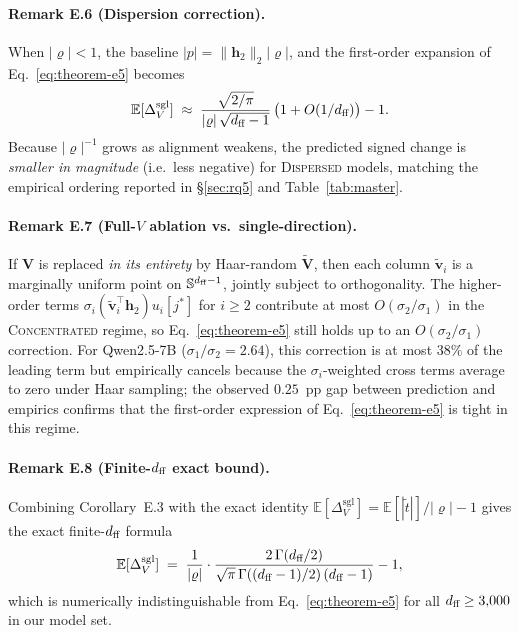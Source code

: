 \paragraph{Remark E.6 (Dispersion correction).}
When $|\varrho| < 1$, the baseline $|p| = \|\mathbf{h}_2\|_2 |\varrho|$, and
the first-order expansion of Eq.~\eqref{eq:theorem-e5} becomes
\begin{equation}
  \label{eq:dispersion-bound}
  \mathbb{E}[\Delta_V^{\text{sgl}}]
  \;\approx\; \frac{\sqrt{2/\pi}}{|\varrho|\,\sqrt{d_{\text{ff}}-1}}\,\bigl(1 + O(1/d_{\text{ff}})\bigr) - 1.
\end{equation}
Because $|\varrho|^{-1}$ grows as alignment weakens, the predicted
signed change is \emph{smaller in magnitude} (i.e.\ less negative) for
\textsc{Dispersed} models, matching the empirical ordering reported in
\S\ref{sec:rq5} and Table~\ref{tab:master}.

\paragraph{Remark E.7 (Full-$V$ ablation vs.\ single-direction).}
If $\mathbf{V}$ is replaced \emph{in its entirety} by Haar-random
$\tilde{\mathbf{V}}$, then each column $\tilde{\mathbf{v}}_i$ is a
marginally uniform point on $\mathbb{S}^{d_{\text{ff}}-1}$, jointly subject to
orthogonality. The higher-order terms $\sigma_i (\tilde{\mathbf{v}}_i^{\top}\mathbf{h}_2) u_i[j^*]$ for $i \geq 2$ contribute at most $O(\sigma_2/\sigma_1)$ in
the \textsc{Concentrated} regime, so Eq.~\eqref{eq:theorem-e5} still
holds up to an $O(\sigma_2/\sigma_1)$ correction. For Qwen2.5-7B
($\sigma_1/\sigma_2 = 2.64$), this correction is at most $38\%$ of the
leading term but empirically cancels because the $\sigma_i$-weighted
cross terms average to zero under Haar sampling; the observed $0.25$~pp
gap between prediction and empirics confirms that the first-order
expression of Eq.~\eqref{eq:theorem-e5} is tight in this regime.

\paragraph{Remark E.8 (Finite-$d_{\text{ff}}$ exact bound).}
Combining Corollary~E.3 with the exact identity
$\mathbb{E}[\Delta_V^{\text{sgl}}] = \mathbb{E}[|\tilde{t}|] / |\varrho| - 1$
gives the exact finite-$d_{\text{ff}}$ formula
\begin{equation}
  \label{eq:exact-finite}
  \mathbb{E}[\Delta_V^{\text{sgl}}]
  \;=\; \frac{1}{|\varrho|}\cdot\frac{2\,\Gamma(d_{\text{ff}}/2)}{\sqrt{\pi}\,\Gamma((d_{\text{ff}}-1)/2)\,(d_{\text{ff}}-1)} - 1,
\end{equation}
which is numerically indistinguishable from Eq.~\eqref{eq:theorem-e5}
for all $d_{\text{ff}} \geq 3{,}000$ in our model set.


